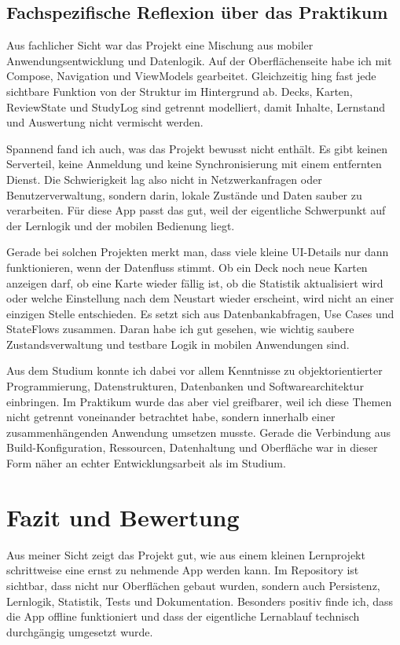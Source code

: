 \documentclass{Vorlage}
\begin{document}
\subsection{Fachspezifische Reflexion \"uber das Praktikum}

Aus fachlicher Sicht war das Projekt eine Mischung aus mobiler Anwendungsentwicklung und Datenlogik. Auf der Oberfl\"achenseite habe ich mit Compose, Navigation und ViewModels gearbeitet. Gleichzeitig hing fast jede sichtbare Funktion von der Struktur im Hintergrund ab. Decks, Karten, ReviewState und StudyLog sind getrennt modelliert, damit Inhalte, Lernstand und Auswertung nicht vermischt werden.

Spannend fand ich auch, was das Projekt bewusst nicht enth\"alt. Es gibt keinen Serverteil, keine Anmeldung und keine Synchronisierung mit einem entfernten Dienst. Die Schwierigkeit lag also nicht in Netzwerkanfragen oder Benutzerverwaltung, sondern darin, lokale Zust\"ande und Daten sauber zu verarbeiten. F\"ur diese App passt das gut, weil der eigentliche Schwerpunkt auf der Lernlogik und der mobilen Bedienung liegt.

Gerade bei solchen Projekten merkt man, dass viele kleine UI-Details nur dann funktionieren, wenn der Datenfluss stimmt. Ob ein Deck noch neue Karten anzeigen darf, ob eine Karte wieder f\"allig ist, ob die Statistik aktualisiert wird oder welche Einstellung nach dem Neustart wieder erscheint, wird nicht an einer einzigen Stelle entschieden. Es setzt sich aus Datenbankabfragen, Use Cases und StateFlows zusammen. Daran habe ich gut gesehen, wie wichtig saubere Zustandsverwaltung und testbare Logik in mobilen Anwendungen sind.

Aus dem Studium konnte ich dabei vor allem Kenntnisse zu objektorientierter Programmierung, Datenstrukturen, Datenbanken und Softwarearchitektur einbringen. Im Praktikum wurde das aber viel greifbarer, weil ich diese Themen nicht getrennt voneinander betrachtet habe, sondern innerhalb einer zusammenh\"angenden Anwendung umsetzen musste. Gerade die Verbindung aus Build-Konfiguration, Ressourcen, Datenhaltung und Oberfl\"ache war in dieser Form n\"aher an echter Entwicklungsarbeit als im Studium.

\renewcommand{\thesection}{\Roman{section}}

\section{Fazit und Bewertung}

Aus meiner Sicht zeigt das Projekt gut, wie aus einem kleinen Lernprojekt schrittweise eine ernst zu nehmende App werden kann. Im Repository ist sichtbar, dass nicht nur Oberfl\"achen gebaut wurden, sondern auch Persistenz, Lernlogik, Statistik, Tests und Dokumentation. Besonders positiv finde ich, dass die App offline funktioniert und dass der eigentliche Lernablauf technisch durchg\"angig umgesetzt wurde.
\end{document}
